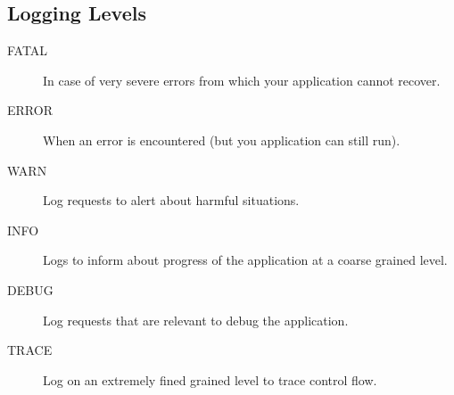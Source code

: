 \documentclass[a4paper,10pt]{article}
\begin{document}
\subsection{Logging Levels}
\begin{description}
	\item[FATAL] In case of very severe errors from which your application cannot recover.
	\item[ERROR] When an error is encountered (but you application can still run).
	\item[WARN] Log requests to alert about harmful situations.
	\item[INFO] Logs to inform about progress of the application at a coarse grained level.
	\item[DEBUG] Log requests that are relevant to debug the application.
	\item[TRACE] Log on an extremely fined grained level to trace control flow.
\end{description}
\end{document}
